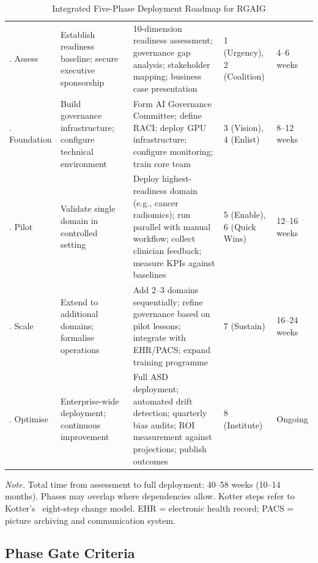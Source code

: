 \tablefontsize
\begin{xltabular}
{\textwidth}{@{} L L L L L @{}}
\caption{Integrated Five-Phase Deployment Roadmap for RGAIG}\label{tab:dt_roadmap} \\
\toprule
{} &  &  &  &  \\
\midrule
\endfirsthead
\endhead
\bottomrule
{}. Assess & Establish readiness baseline; secure executive sponsorship & 10-dimension readiness assessment; governance gap analysis; stakeholder mapping; business case presentation & 1 (Urgency), 2 (Coalition) & 4--6 weeks \\
. Foundation & Build governance infrastructure; configure technical environment & Form AI Governance Committee; define RACI; deploy GPU infrastructure; configure monitoring; train core team & 3 (Vision), 4 (Enlist) & 8--12 weeks \\
. Pilot & Validate single domain in controlled setting & Deploy highest-readiness domain (e.g., cancer radiomics); run parallel with manual workflow; collect clinician feedback; measure KPIs against baselines & 5 (Enable), 6 (Quick Wins) & 12--16 weeks \\
. Scale & Extend to additional domains; formalise operations & Add 2--3 domains sequentially; refine governance based on pilot lessons; integrate with EHR/PACS; expand training programme & 7 (Sustain) & 16--24 weeks \\
. Optimise & Enterprise-wide deployment; continuous improvement & Full ASD deployment; automated drift detection; quarterly bias audits; ROI measurement against projections; publish outcomes & 8 (Institute) & Ongoing \\
\end{xltabular}
\vspace{0.5em}\noindent\textit{Note.} Total time from assessment to full deployment: 40--58 weeks (10--14 months). Phases may overlap where dependencies allow. Kotter steps refer to Kotter's~\cite{kotter1996leading} eight-step change model. EHR = electronic health record; PACS = picture archiving and communication system.

\subsection{Phase Gate Criteria}


